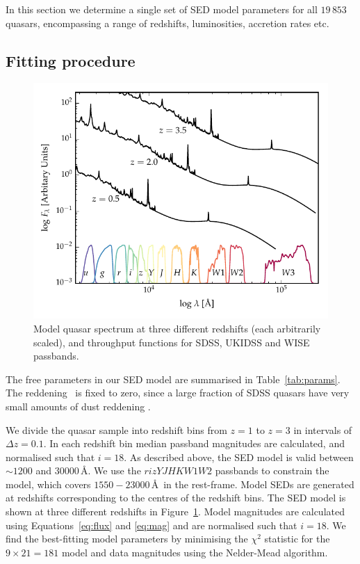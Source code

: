 In this section we determine a single set of SED model parameters for all $19\,853$ quasars, encompassing a range of redshifts, luminosities, accretion rates etc. 

\subsection{Fitting procedure}

\begin{figure}
  \centering
  \includegraphics[width=\textwidth]{figures/chapter05/throughput.pdf}
  \caption[{Model quasar spectrum at three different redshifts, and throughput functions for SDSS, UKIDSS and WISE passbands.}]{Model quasar spectrum at three different redshifts (each arbitrarily scaled), and throughput functions for SDSS, UKIDSS and WISE passbands.}
  \label{fig:filters}
\end{figure}

The free parameters in our SED model are summarised in Table~\ref{tab:params}. 
The reddening \ebv\, is fixed to zero, since a large fraction of SDSS quasars have very small amounts of dust reddening \citep{richards03}. 

We divide the quasar sample into redshift bins from $z=1$ to $z=3$ in intervals of $\Delta z = 0.1$.
In each redshift bin median passband magnitudes are calculated, and normalised such that $i=18$.
As described above, the SED model is valid between $\sim1200$ and $30000$\,\AA.  
We use the $rizYJHKW1W2$ passbands to constrain the model, which covers $1550-23000$\,\AA\, in the rest-frame. 
Model SEDs are generated at redshifts corresponding to the centres of the redshift bins.
The SED model is shown at three different redshifts in Figure~\ref{fig:filters}.
Model magnitudes are calculated using Equations~\ref{eq:flux} and \ref{eq:mag} and are normalised such that $i=18$.
We find the best-fitting model parameters by minimising the $\chi^2$ statistic for the $9 \times 21 = 181$ model and data magnitudes using the Nelder-Mead algorithm. 

